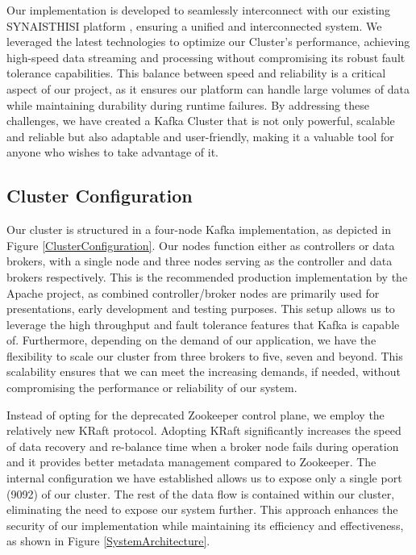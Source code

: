 Our implementation is developed to seamlessly interconnect with our existing SYNAISTHISI platform , ensuring a unified and interconnected system. We leveraged the latest technologies to optimize our Cluster's performance, achieving high-speed data streaming and processing without compromising its robust fault tolerance capabilities. This balance between speed and reliability is a critical aspect of our project, as it ensures our platform can handle large volumes of data while maintaining durability during runtime failures. By addressing these challenges, we have created a Kafka Cluster that is not only powerful, scalable and reliable but also adaptable and user-friendly, making it a valuable tool for anyone who wishes to take advantage of it.

\subsection{Cluster Configuration}

Our cluster is structured in a four-node Kafka implementation, as depicted in Figure \ref{ClusterConfiguration}. Our nodes function either as controllers or data brokers, with a single node and three nodes serving as the controller and data brokers respectively. This is the recommended production implementation by the Apache project, as combined controller/broker nodes are primarily used for presentations, early development and testing purposes. This setup allows us to leverage the high throughput and fault tolerance features that Kafka is capable of. Furthermore, depending on the demand of our application, we have the flexibility to scale our cluster from three brokers to five, seven and beyond. This scalability ensures that we can meet the increasing demands, if needed, without compromising the performance or reliability of our system.
 
Instead of opting for the deprecated Zookeeper control plane, we employ the relatively new KRaft protocol. Adopting KRaft significantly increases the speed of data recovery and re-balance time when a broker node fails during operation and it provides better metadata management compared to Zookeeper. The internal configuration we have established allows us to expose only a single port (9092) of our cluster. The rest of the data flow is contained within our cluster, eliminating the need to expose our system further. This approach enhances the security of our implementation while maintaining its efficiency and effectiveness, as shown in Figure \ref{SystemArchitecture}.

